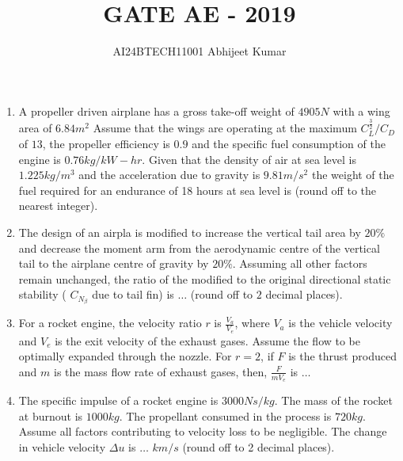 \documentclass[journal]{IEEEtran}
\begin{document}

\vspace{3cm}


\renewcommand{\thefigure}{\theenumi}
\renewcommand{\thetable}{\theenumi}
\setlength{\intextsep}{10pt} %


\renewcommand{\thetable}{\theenumi}

\title{GATE AE - 2019}
\author{AI24BTECH11001 Abhijeet Kumar
}
\maketitle
\renewcommand{\thefigure}{\theenumi}
\renewcommand{\thetable}{\theenumi}
\begin{enumerate}[start=53]
    \item A propeller driven airplane has a gross take-off weight of $4905 N$ with a wing area of $6.84 m^2$ Assume that the wings are operating at the maximum $C_{L}^{\frac{3}{2}} / C_{D}$ of $13$, the propeller efficiency is $0.9$ and the specific fuel consumption of the engine is $0.76 kg/kW-hr$. Given that the density of air at sea level is $1.225kg/m^3$ and the acceleration due to gravity is $9.81 m/s^2$ the weight of the fuel required for an endurance of 18 hours at sea level is (round off to the nearest integer).

    \item The design of an airpla is modified to increase the vertical tail area by $20 \%$ and decrease the moment arm from the aerodynamic centre of the vertical tail to the airplane centre of gravity by $20 \%$. Assuming all other factors remain unchanged, the ratio of the modified to the original directional static stability ( $C_{N_\beta}$ due to tail fin) is $\dots$ (round off to $2$ decimal places).

    \item For a rocket engine, the velocity ratio $r$ is $\frac{V_a}{V_e}$, where $V_a$ is the vehicle velocity and $V_e$ is the exit velocity of the exhaust gases. Assume the flow to be optimally expanded through the nozzle. For $r = 2$, if $F$ is the thrust produced and $m$ is the mass flow rate of exhaust gases, then, $\frac{F}{mV_e}$ is $\dots$

    \item The specific impulse of a rocket engine is $3000 Ns/kg$. The mass of the rocket at burnout is $1000 kg$. The propellant consumed in the process is $720 kg$. Assume all factors contributing to velocity loss to be negligible. The change in vehicle velocity $\Delta u$ is $\dots$ $km/s$ (round off to 2 decimal places).


\end{enumerate}
\end{document}
